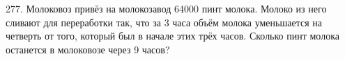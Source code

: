 277. Молоковоз привёз на молокозавод 64000 пинт молока. Молоко из него сливают для переработки так, что за 3 часа объём молока уменьшается на четверть от того, который был в начале этих трёх часов. Сколько пинт молока останется в молоковозе через 9 часов?\\
